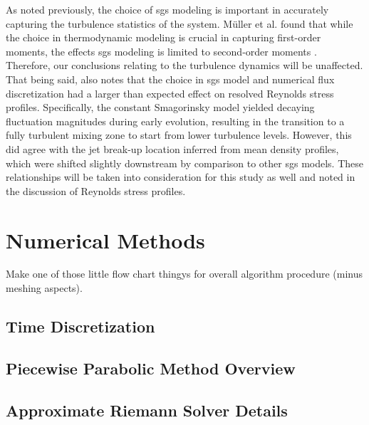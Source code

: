 As noted previously, the choice of \gls{sgs} modeling is important in accurately capturing the turbulence statistics of the system. M\"{u}ller et al. found that while the choice in thermodynamic modeling is crucial in capturing first-order moments, the effects \gls{sgs} modeling is limited to second-order moments \cite{doi:10.1063/1.4937948}. Therefore, our conclusions relating to the turbulence dynamics will be unaffected. That being said, \cite{doi:10.1063/1.4937948} also notes that the choice in \gls{sgs} model and numerical flux discretization had a larger than expected effect on resolved Reynolds stress profiles. Specifically, the constant Smagorinsky model yielded decaying fluctuation magnitudes during early evolution, resulting in the transition to a fully turbulent mixing zone to start from lower turbulence levels. However, this did agree with the jet break-up location inferred from mean density profiles, which were shifted slightly downstream by comparison to other \gls{sgs} models. These relationships will be taken into consideration for this study as well and noted in the discussion of Reynolds stress profiles.



\section{Numerical Methods}
Make one of those little flow chart thingys for overall algorithm procedure (minus meshing aspects).
\subsection{Time Discretization}
\subsection{Piecewise Parabolic Method Overview}
\subsection{Approximate Riemann Solver Details}


